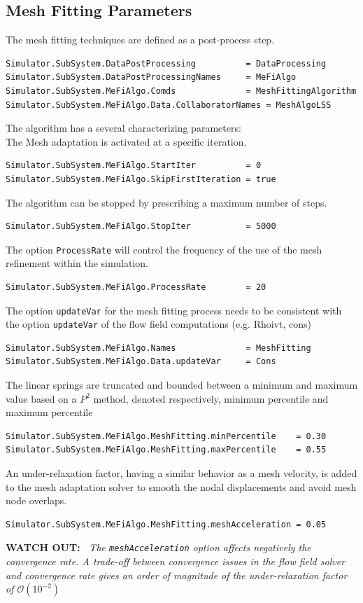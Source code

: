 \documentclass[11pt]{article}
\begin{document}
\subsection{Mesh Fitting Parameters}
The mesh fitting techniques are defined as a post-process step.
\begin{verbatim}
Simulator.SubSystem.DataPostProcessing          = DataProcessing
Simulator.SubSystem.DataPostProcessingNames     = MeFiAlgo
Simulator.SubSystem.MeFiAlgo.Comds              = MeshFittingAlgorithm
Simulator.SubSystem.MeFiAlgo.Data.CollaboratorNames = MeshAlgoLSS
\end{verbatim}
The algorithm has a several characterizing parameters:\\
\newline
The Mesh adaptation is activated at a specific iteration.
\begin{verbatim}
Simulator.SubSystem.MeFiAlgo.StartIter          = 0
Simulator.SubSystem.MeFiAlgo.SkipFirstIteration = true
\end{verbatim}
The algorithm can be stopped by prescribing a maximum number of steps.
\begin{verbatim}
Simulator.SubSystem.MeFiAlgo.StopIter           = 5000  
\end{verbatim}
The option {\tt ProcessRate} will control the frequency of the use of the mesh refinement within the simulation.
\begin{verbatim}
Simulator.SubSystem.MeFiAlgo.ProcessRate        = 20
\end{verbatim}
The option {\tt updateVar} for the mesh fitting process needs to be consistent with the option {\tt updateVar} of the flow field computations (e.g. Rhoivt, cons)
\begin{verbatim}
Simulator.SubSystem.MeFiAlgo.Names              = MeshFitting
Simulator.SubSystem.MeFiAlgo.Data.updateVar     = Cons
\end{verbatim}
The linear springs are truncated and bounded between a minimum and maximum value based on a $P^2$ method, denoted respectively, minimum percentile and maximum percentile
\begin{verbatim}
Simulator.SubSystem.MeFiAlgo.MeshFitting.minPercentile    = 0.30
Simulator.SubSystem.MeFiAlgo.MeshFitting.maxPercentile    = 0.55
\end{verbatim}
An under-relaxation factor,  having a similar behavior as a mesh velocity, is added to the mesh adaptation solver to smooth the nodal displacements and avoid mesh node overlaps.
\begin{verbatim}
Simulator.SubSystem.MeFiAlgo.MeshFitting.meshAcceleration = 0.05
\end{verbatim}
{\bf WATCH OUT:~} {\it The {\tt meshAcceleration} option affects negatively the convergence rate. A trade-off between convergence issues in the flow field solver and convergence rate gives an order of magnitude of the under-relaxation factor of $\mathcal{O}(10^{-2})$}
\end{document}

